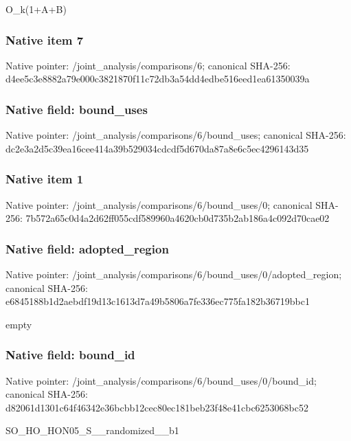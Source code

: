 \documentclass[10pt,a4paper]{article}
\begin{document}
\begingroup\raggedright\sloppy O\_\allowbreak{}k(1+A+B)\par\endgroup

\subsubsection{Native item 7}
Native pointer: /joint\_\allowbreak{}analysis/comparisons/6; canonical SHA-256: d4ee5c3e8882a79e000c3821870f11c72db3a54dd4edbe516eed1ea61350039a

\subsubsection{Native field: bound\_\allowbreak{}uses}
Native pointer: /joint\_\allowbreak{}analysis/comparisons/6/bound\_\allowbreak{}uses; canonical SHA-256: dc2e3a2d5c39ea16cee414a39b529034cdcdf5d670da87a8e6c5ec4296143d35

\subsubsection{Native item 1}
Native pointer: /joint\_\allowbreak{}analysis/comparisons/6/bound\_\allowbreak{}uses/0; canonical SHA-256: 7b572a65c0d4a2d62ff055cdf589960a4620cb0d735b2ab186a4c092d70cae02

\subsubsection{Native field: adopted\_\allowbreak{}region}
Native pointer: /joint\_\allowbreak{}analysis/comparisons/6/bound\_\allowbreak{}uses/0/adopted\_\allowbreak{}region; canonical SHA-256: e6845188b1d2aebdf19d13c1613d7a49b5806a7fe336ec775fa182b36719bbc1

\begingroup\raggedright\sloppy empty\par\endgroup

\subsubsection{Native field: bound\_\allowbreak{}id}
Native pointer: /joint\_\allowbreak{}analysis/comparisons/6/bound\_\allowbreak{}uses/0/bound\_\allowbreak{}id; canonical SHA-256: d82061d1301c64f46342e36bcbb12cec80ec181beb23f48e41cbc6253068bc52

\begingroup\raggedright\sloppy SO\_\allowbreak{}HO\_\allowbreak{}HON05\_\allowbreak{}S\_\allowbreak{}\_\allowbreak{}randomized\_\allowbreak{}\_\allowbreak{}b1\par\endgroup
\end{document}
